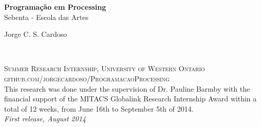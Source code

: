\documentclass[11pt,fleqn]{book} %
\begin{document}

\begingroup
\thispagestyle{empty}
\centering
\vspace*{5cm}
\par\normalfont\fontsize{35}{35}\sffamily\selectfont
\textbf{Programação em Processing}\\
{\LARGE Sebenta - Escola das Artes}\par %
\vspace*{1cm}
{\Huge Jorge C. S. Cardoso}\par %
\endgroup


\newpage
~\vfill
\thispagestyle{empty}


\noindent \textsc{Summer Research Internship, University of Western Ontario}\\

\noindent \textsc{github.com/jorgecardoso/ProgramacaoProcessing}\\ %

\noindent This research was done under the supervision of Dr. Pauline Barmby with the financial support of the MITACS Globalink Research Internship Award within a total of 12 weeks, from June 16th to September 5th of 2014.\\ %

\noindent \textit{First release, August 2014} %



\pagestyle{empty} %

\tableofcontents %
\end{document}
